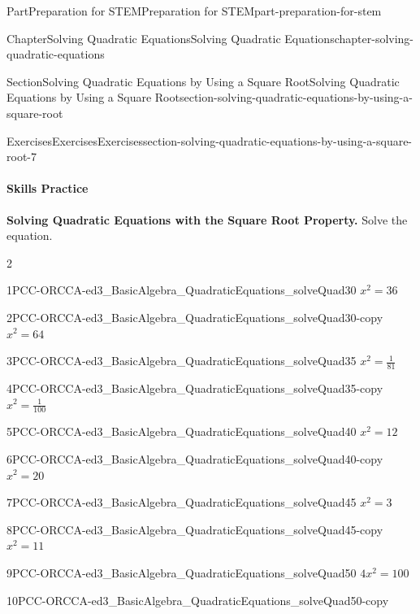 \documentclass[twoside,10pt,]{book}
\numberwithin{equation}{section}
\begin{document}
\begin{partptx}{Part}{Preparation for STEM}{}{Preparation for STEM}{}{}{part-preparation-for-stem}
\begin{chapterptx}{Chapter}{Solving Quadratic Equations}{}{Solving Quadratic Equations}{}{}{chapter-solving-quadratic-equations}
\begin{sectionptx}{Section}{Solving Quadratic Equations by Using a Square Root}{}{Solving Quadratic Equations by Using a Square Root}{}{}{section-solving-quadratic-equations-by-using-a-square-root}
\begin{exercises-subsection}{Exercises}{Exercises}{}{Exercises}{}{}{section-solving-quadratic-equations-by-using-a-square-root-7}
\paragraph{Skills Practice}\hypertarget{section-solving-quadratic-equations-by-using-a-square-root-7-1}{}
\par\medskip\noindent%
\textbf{Solving Quadratic Equations with the Square Root Property.}\space\space%
Solve the equation.%
\begin{exercisegroupcol}{2}
\begin{divisionexerciseegcol}{1}{}{}{PCC-ORCCA-ed3_BasicAlgebra_QuadraticEquations_solveQuad30}%
\(x^2 = 36\)%
\end{divisionexerciseegcol}%
\begin{divisionexerciseegcol}{2}{}{}{PCC-ORCCA-ed3_BasicAlgebra_QuadraticEquations_solveQuad30-copy}%
\(x^2 = 64\)%
\end{divisionexerciseegcol}%
\begin{divisionexerciseegcol}{3}{}{}{PCC-ORCCA-ed3_BasicAlgebra_QuadraticEquations_solveQuad35}%
\(x^2 = {{\frac{1}{81}}}\)%
\end{divisionexerciseegcol}%
\begin{divisionexerciseegcol}{4}{}{}{PCC-ORCCA-ed3_BasicAlgebra_QuadraticEquations_solveQuad35-copy}%
\(x^2 = {{\frac{1}{100}}}\)%
\end{divisionexerciseegcol}%
\begin{divisionexerciseegcol}{5}{}{}{PCC-ORCCA-ed3_BasicAlgebra_QuadraticEquations_solveQuad40}%
\(x^2 = 12\)%
\end{divisionexerciseegcol}%
\begin{divisionexerciseegcol}{6}{}{}{PCC-ORCCA-ed3_BasicAlgebra_QuadraticEquations_solveQuad40-copy}%
\(x^2 = 20\)%
\end{divisionexerciseegcol}%
\begin{divisionexerciseegcol}{7}{}{}{PCC-ORCCA-ed3_BasicAlgebra_QuadraticEquations_solveQuad45}%
\(x^2 = 3\)%
\end{divisionexerciseegcol}%
\begin{divisionexerciseegcol}{8}{}{}{PCC-ORCCA-ed3_BasicAlgebra_QuadraticEquations_solveQuad45-copy}%
\(x^2 = 11\)%
\end{divisionexerciseegcol}%
\begin{divisionexerciseegcol}{9}{}{}{PCC-ORCCA-ed3_BasicAlgebra_QuadraticEquations_solveQuad50}%
\(4x^2 = 100\)%
\end{divisionexerciseegcol}%
\begin{divisionexerciseegcol}{10}{}{}{PCC-ORCCA-ed3_BasicAlgebra_QuadraticEquations_solveQuad50-copy}%

\end{divisionexerciseegcol}
\end{exercisegroupcol}
\end{exercises-subsection}
\end{sectionptx}
\end{chapterptx}
\end{partptx}
\end{document}
